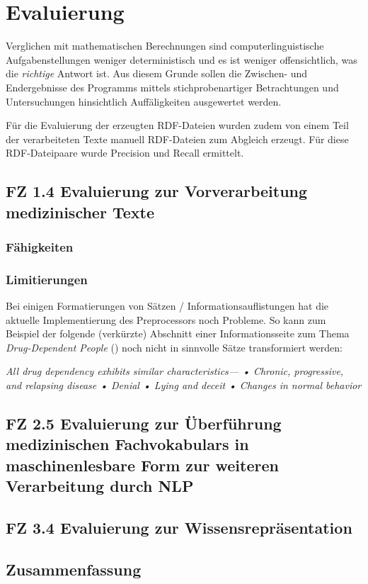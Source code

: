 \chapter{Evaluierung}
\label{ch:evaluierung}

Verglichen mit mathematischen Berechnungen sind computerlinguistische Aufgabenstellungen weniger deterministisch und es ist weniger offensichtlich, was die \emph{richtige} Antwort ist.  Aus diesem Grunde sollen die Zwischen- und Endergebnisse des Programms mittels stichprobenartiger Betrachtungen und Untersuchungen hinsichtlich Auffäligkeiten ausgewertet werden. 

Für die Evaluierung der erzeugten RDF-Dateien wurden zudem von einem Teil der verarbeiteten Texte manuell RDF-Dateien zum Abgleich erzeugt. Für diese RDF-Dateipaare wurde Precision und Recall ermittelt.


\section{FZ 1.4 Evaluierung zur Vorverarbeitung medizinischer Texte}
\label{sec:FZ1.4} 

\subsection{Fähigkeiten}


\subsection{Limitierungen} 
Bei einigen Formatierungen von Sätzen / Informationsauflistungen hat die aktuelle Implementierung des Preprocessors noch Probleme.
So kann zum Beispiel der folgende (verkürzte) Abschnitt einer Informationsseite zum Thema \emph{Drug-Dependent People} (\cite{drug_dependent_people}) noch nicht in sinnvolle Sätze transformiert werden:\\
\begin{addmargin}{10pt}
	\emph{
	All drug dependency exhibits similar characteristics— • Chronic, progressive, and relapsing disease • Denial • Lying and deceit • Changes in normal behavior
	}
\end{addmargin}
\vspace*{5mm}



\section{FZ 2.5 Evaluierung zur Überführung medizinischen Fachvokabulars in maschinenlesbare Form zur weiteren Verarbeitung durch NLP}
\label{sec:FZ2.5} 

\section{FZ 3.4 Evaluierung zur Wissensrepräsentation}
\label{sec:FZ3.4} 








\section{Zusammenfassung}
\label{sec:zusammenfassung_evaluierung} 

